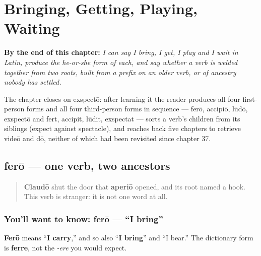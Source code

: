 
\chapter{Bringing, Getting, Playing, Waiting}
\label{ch:la-getting-and-waiting-verbs}

\begin{chapteropening}
\textbf{By the end of this chapter:} \emph{I can say I bring, I get, I play and I wait in Latin, produce the he-or-she form of each, and say whether a verb is welded together from two roots, built from a prefix on an older verb, or of ancestry nobody has settled.}

The chapter closes on exspectō: after learning it the reader produces all four first-person forms and all four third-person forms in sequence — ferō, accipiō, lūdō, exspectō and fert, accipit, lūdit, exspectat — sorts a verb's children from its siblings (expect against spectacle), and reaches back five chapters to retrieve videō and dō, neither of which had been revisited since chapter 37.
\end{chapteropening}

\section[ferō, ferre]{ferō — one verb, two ancestors}

\label{lesson:LA-C42-fero}



\begin{quote}
\textbf{Claudō} shut the door that \textbf{aperiō} opened, and its root named a hook. This verb is stranger: it is not one word at all.
\end{quote}

\subsection*{You'll want to know: ferō — \textquotedblleft{}I bring\textquotedblright{}}
\textbf{Ferō} means \textquotedblleft{}\textbf{I carry},\textquotedblright{} and so also \textquotedblleft{}\textbf{I bring}\textquotedblright{} and \textquotedblleft{}I bear.\textquotedblright{} The dictionary form is \textbf{ferre}, not the \emph{-ere} you would expect.

